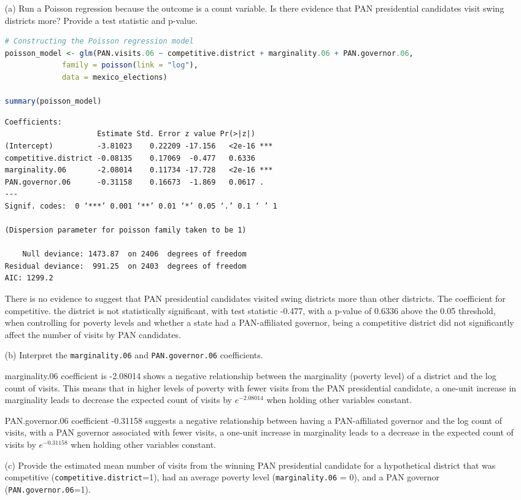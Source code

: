 \documentclass[12pt,letterpaper]{article}
\begin{document}
\begin{enumerate}
	\item [(a)]
	Run a Poisson regression because the outcome is a count variable. Is there evidence that PAN presidential candidates visit swing districts more? Provide a test statistic and p-value.
\begin{lstlisting}[language=R] 
# Constructing the Poisson regression model
poisson_model <- glm(PAN.visits.06 ~ competitive.district + marginality.06 + PAN.governor.06, 
             family = poisson(link = "log"), 
             data = mexico_elections)

summary(poisson_model)
\end{lstlisting} 
\begin{verbatim}
Coefficients:
                     Estimate Std. Error z value Pr(>|z|)    
(Intercept)          -3.81023    0.22209 -17.156   <2e-16 ***
competitive.district -0.08135    0.17069  -0.477   0.6336    
marginality.06       -2.08014    0.11734 -17.728   <2e-16 ***
PAN.governor.06      -0.31158    0.16673  -1.869   0.0617 .  
---
Signif. codes:  0 ‘***’ 0.001 ‘**’ 0.01 ‘*’ 0.05 ‘.’ 0.1 ‘ ’ 1

(Dispersion parameter for poisson family taken to be 1)

    Null deviance: 1473.87  on 2406  degrees of freedom
Residual deviance:  991.25  on 2403  degrees of freedom
AIC: 1299.2
\end{verbatim}
There is no evidence to suggest that PAN presidential candidates visited swing districts more than other districts. The coefficient for competitive. the district is not statistically significant, with test statistic -0.477,  with a p-value of 0.6336 above the 0.05 threshold, when controlling for poverty levels and whether a state had a PAN-affiliated governor, being a competitive district did not significantly affect the number of visits by PAN candidates. 
	\item [(b)]
	Interpret the \texttt{marginality.06} and \texttt{PAN.governor.06} coefficients.

 marginality.06 coefficient is -2.08014 shows a negative relationship between the marginality (poverty level) of a district and the log count of visits. This means that in higher levels of poverty with fewer visits from the PAN presidential candidate,  a one-unit increase in marginality leads to decrease the expected count of visits by $e^{-2.08014}$
when holding other variables constant.

PAN.governor.06 coefficient  -0.31158 suggests a negative relationship between having a PAN-affiliated governor and the log count of visits, with a PAN governor associated with fewer visits,  a one-unit increase in marginality leads to a decrease in the expected count of visits by $e^{-0.31158}$ when holding other variables constant.
	\item [(c)]
	Provide the estimated mean number of visits from the winning PAN presidential candidate for a hypothetical district that was competitive (\texttt{competitive.district}=1), had an average poverty level (\texttt{marginality.06} = 0), and a PAN governor (\texttt{PAN.governor.06}=1).


\end{enumerate}
\end{document}
